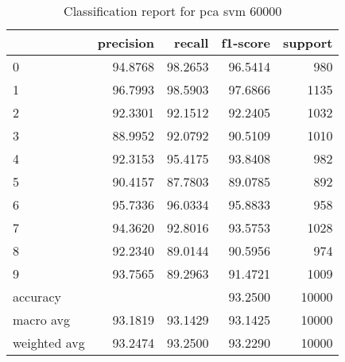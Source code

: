 \begin{table}[htb!]
\centering
\begin{tabular}{lrrrr}
    \toprule
    & precision & recall & f1-score & support \\
    \midrule
    0 & 94.8768 & 98.2653 & 96.5414 & 980 \\
    1 & 96.7993 & 98.5903 & 97.6866 & 1135 \\
    2 & 92.3301 & 92.1512 & 92.2405 & 1032 \\
    3 & 88.9952 & 92.0792 & 90.5109 & 1010 \\
    4 & 92.3153 & 95.4175 & 93.8408 & 982 \\
    5 & 90.4157 & 87.7803 & 89.0785 & 892 \\
    6 & 95.7336 & 96.0334 & 95.8833 & 958 \\
    7 & 94.3620 & 92.8016 & 93.5753 & 1028 \\
    8 & 92.2340 & 89.0144 & 90.5956 & 974 \\
    9 & 93.7565 & 89.2963 & 91.4721 & 1009 \\
    accuracy &  & & 93.2500 & 10000\\
    macro avg & 93.1819 & 93.1429 & 93.1425 & 10000 \\
    weighted avg & 93.2474 & 93.2500 & 93.2290 & 10000 \\
\bottomrule
\end{tabular}
\caption{Classification report for pca svm 60000}
\label{tab:classification-report-pca_svm_60000}
\end{table}
